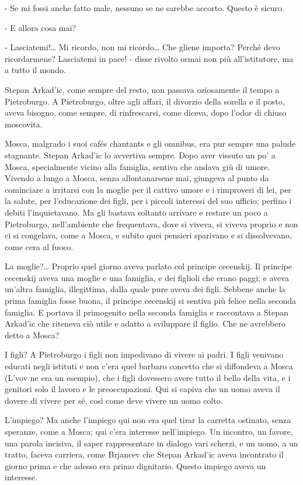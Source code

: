 - Se mi fossi anche fatto male, nessuno se ne sarebbe accorto. Questo è sicuro. 

- E allora cosa mai? 

- Lasciatemi!\ldots{} Mi ricordo, non mi ricordo\ldots{} Che gliene importa? Perché devo ricordarmene? Lasciatemi in pace! - disse rivolto ormai non più all'istitutore, ma a tutto il mondo. 

Stepan Arkad'ic, come sempre del resto, non passava oziosamente il tempo a Pietroburgo. A Pietroburgo, oltre agli affari, il divorzio della sorella e il posto, aveva bisogno, come sempre, di rinfrescarsi, come diceva, dopo l'odor di chiuso moscovita. 

Mosca, malgrado i suoi cafés chantants e gli omnibus, era pur sempre una palude stagnante. Stepan Arkad'ic lo avvertiva sempre. Dopo aver vissuto un po' a Mosca, specialmente vicino alla famiglia, sentiva che andava giù di umore. Vivendo a lungo a Mosca, senza allontanarsene mai, giungeva al punto da cominciare a irritarsi con la moglie per il cattivo umore e i rimproveri di lei, per la salute, per l'educazione dei figli, per i piccoli interessi del suo ufficio; perfino i debiti l'inquietavano. Ma gli bastava soltanto arrivare e restare un poco a Pietroburgo, nell'ambiente che frequentava, dove si viveva, si viveva proprio e non ci si congelava, come a Mosca, e subito quei pensieri sparivano e si dissolvevano, come cera al fuoco. 

La moglie?\ldots{} Proprio quel giorno aveva parlato col principe cecenskij. Il principe cecenskij aveva una moglie e una famiglia, e dei figlioli che erano paggi; e aveva un'altra famiglia, illegittima, dalla quale pure aveva dei figli. Sebbene anche la prima famiglia fosse buona, il principe cecenskij si sentiva più felice nella seconda famiglia. E portava il primogenito nella seconda famiglia e raccontava a Stepan Arkad'ic che riteneva ciò utile e adatto a sviluppare il figlio. Che ne avrebbero detto a Mosca? 

I figli? A Pietroburgo i figli non impedivano di vivere ai padri. I figli venivano educati negli istituti e non c'era quel barbaro concetto che si diffondeva a Mosca (L'vov ne era un esempio), che i figli dovessero avere tutto il bello della vita, e i genitori solo il lavoro e le preoccupazioni. Qui si capiva che un uomo aveva il dovere di vivere per sé, così come deve vivere un uomo colto. 

L'impiego? Ma anche l'impiego qui non era quel tirar la carretta ostinato, senza speranze, come a Mosca; qui c'era interesse nell'impiego. Un incontro, un favore, una parola incisiva, il saper rappresentare in dialogo vari scherzi, e un uomo, a un tratto, faceva carriera, come Brjancev che Stepan Arkad'ic aveva incontrato il giorno prima e che adesso era primo dignitario. Questo impiego aveva un interesse. 

